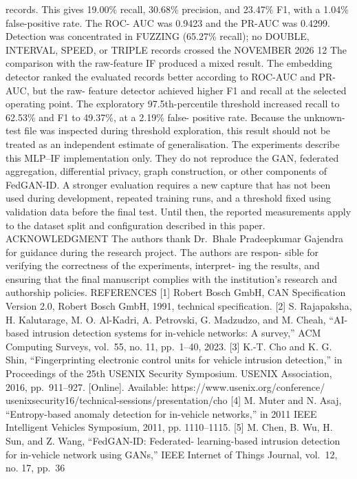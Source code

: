 \documentclass[
]{article}
\begin{document}
records. This gives 19.00\% recall, 30.68\% precision, and 23.47\% F1,
with a 1.04\% false-positive rate. The ROC- AUC was 0.9423 and the
PR-AUC was 0.4299. Detection was concentrated in FUZZING (65.27\%
recall); no DOUBLE, INTERVAL, SPEED, or TRIPLE records crossed the
NOVEMBER 2026 12 The comparison with the raw-feature IF produced a mixed
result. The embedding detector ranked the evaluated records better
according to ROC-AUC and PR-AUC, but the raw- feature detector achieved
higher F1 and recall at the selected operating point. The exploratory
97.5th-percentile threshold increased recall to 62.53\% and F1 to
49.37\%, at a 2.19\% false- positive rate. Because the unknown-test file
was inspected during threshold exploration, this result should not be
treated as an independent estimate of generalisation. The experiments
describe this MLP--IF implementation only. They do not reproduce the
GAN, federated aggregation, differential privacy, graph construction, or
other components of FedGAN-ID. A stronger evaluation requires a new
capture that has not been used during development, repeated training
runs, and a threshold fixed using validation data before the final test.
Until then, the reported measurements apply to the dataset split and
configuration described in this paper. ACKNOWLEDGMENT The authors thank
Dr.~Bhale Pradeepkumar Gajendra for guidance during the research
project. The authors are respon- sible for verifying the correctness of
the experiments, interpret- ing the results, and ensuring that the final
manuscript complies with the institution's research and authorship
policies. REFERENCES {[}1{]} Robert Bosch GmbH, CAN Specification
Version 2.0, Robert Bosch GmbH, 1991, technical specification. {[}2{]}
S. Rajapaksha, H. Kalutarage, M. O. Al-Kadri, A. Petrovski, G. Madzudzo,
and M. Cheah, ``AI-based intrusion detection systems for in-vehicle
networks: A survey,'' ACM Computing Surveys, vol.~55, no. 11, pp.~1--40,
2023. {[}3{]} K.-T. Cho and K. G. Shin, ``Fingerprinting electronic
control units for vehicle intrusion detection,'' in Proceedings of the
25th USENIX Security Symposium. USENIX Association, 2016, pp.~911--927.
{[}Online{]}. Available: https://www.usenix.org/conference/
usenixsecurity16/technical-sessions/presentation/cho {[}4{]} M. Muter
and N. Asaj, ``Entropy-based anomaly detection for in-vehicle
networks,'' in 2011 IEEE Intelligent Vehicles Symposium, 2011, pp.
1110--1115. {[}5{]} M. Chen, B. Wu, H. Sun, and Z. Wang, ``FedGAN-ID:
Federated- learning-based intrusion detection for in-vehicle network
using GANs,'' IEEE Internet of Things Journal, vol.~12, no. 17, pp.~36
\end{document}
